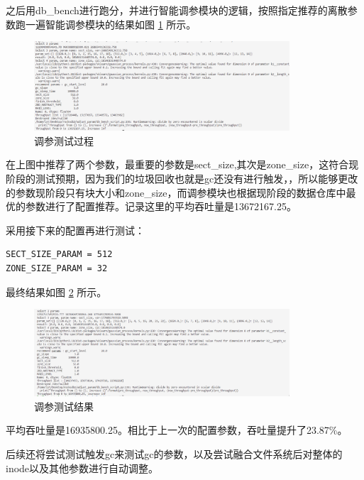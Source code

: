 之后用db\_bench进行跑分，并进行智能调参模块的逻辑，按照指定推荐的离散参数跑一遍智能调参模块的结果如图 \ref{test-turnner2} 所示。

\begin{figure}[htbp]
  \centering
  \includegraphics[width=0.85\textwidth]{fig/turnner2.png}
  \caption{ 调参测试过程 }
  \label{test-turnner2}
\end{figure}

在上图中推荐了两个参数，最重要的参数是sect\_size,其次是zone\_size，这符合现阶段的测试预期，因为我们的垃圾回收也就是gc还没有进行触发，，所以能够更改的参数现阶段只有块大小和zone\_size，而调参模块也根据现阶段的数据仓库中最优的参数进行了配置推荐。记录这里的平均吞吐量是13672167.25。

采用接下来的配置再进行测试：

\begin{lstlisting}
SECT_SIZE_PARAM = 512
ZONE_SIZE_PARAM = 32
\end{lstlisting}

最终结果如图 \ref{test-turnner3} 所示。

\begin{figure}[htbp]
  \centering
  \includegraphics[width=0.85\textwidth]{fig/turnner3.png}
  \caption{ 调参测试结果 }
  \label{test-turnner3}
\end{figure}

平均吞吐量是16935800.25。相比于上一次的配置参数，吞吐量提升了23.87\%。

后续还将尝试测试触发gc来测试gc的参数，以及尝试融合文件系统后对整体的inode以及其他参数进行自动调整。

